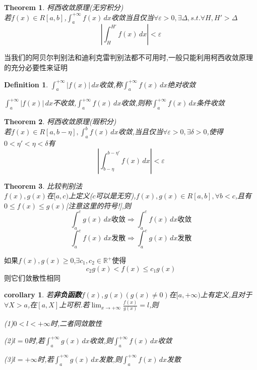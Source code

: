 \documentclass[11pt,hyperref,a4paper,UTF8]{ctexart}
\newtheorem{theorem}{Theorem}[subsection]
\newtheorem{corollary}{corollary}[subsection]
\newtheorem{definition}{Definition}[subsection]
\newcommand{\RR}{\mathbb{R}}
\newcommand{\abs}[1]{\left|#1\right|}
\begin{document}
\begin{CJK}{UTF8}{gkai}
\begin{theorem}
  柯西收敛原理(无穷积分)\\

  若$f(x) \in R[a,b]$,$\int_{a}^{+\infty} f(x)\, dx$收敛当且仅当$\forall \varepsilon > 0,\exists \Delta, s.t. \forall H,H' > \Delta$
  \[\abs{\int_{H}^{H'}f(x)\, dx} < \varepsilon\]
\end{theorem}
当我们的阿贝尔判别法和迪利克雷判别法都不可用时,一般只能利用柯西收敛原理的充分必要性来证明

\begin{definition}
  $\int_{a}^{+\infty}|f(x)|\, dx$收敛,称$\int_{a}^{+\infty}f(x)\, dx$绝对收敛

  $\int_{a}^{+\infty}|f(x)|\, dx$不收敛,$\int_{a}^{+\infty}f(x)\, dx$收敛,则称$\int_{a}^{+\infty}f(x)\, dx$条件收敛
\end{definition}

\begin{theorem}
  柯西收敛原理(瑕积分)\\
  
  若$f(x)\in R[a,b - \eta], \int_{a}^{b}f(x)\, dx$收敛,当且仅当$\forall \varepsilon > 0,\exists \delta > 0$,使得$0 < \eta' < \eta < \delta$有
  \[\abs{\int_{b - \eta}^{b - \eta'}f(x)\, dx}  < \varepsilon\]
\end{theorem}

\begin{theorem}
  比较判别法\\

  $f(x),g(x)$在$[a,c)$上定义($c$可以是无穷),$f(x),g(x)\in R[a,b],\forall b < c$,且有$0 \leq f(x) \leq g(x)$[注意这里的符号!],则
  \[\int_{a}^{c}g(x)\, dx\text{收敛} \Rightarrow \int_{a}^{c}f(x)\, dx\text{收敛}\]
  \[\int_{a}^{c}f(x)\, dx\text{发散} \Rightarrow \int_{a}^{c}g(x)\, dx\text{发散}\]
\end{theorem}

如果$f(x),g(x) \geq 0$,$\exists c_1,c_2 \in \RR^+$使得
\[c_2 g(x) < f(x) \leq c_1 g(x)\]
则它们敛散性相同

\begin{corollary}
  若\textbf{非负函数}$f(x),g(x)(g(x) \neq 0)$在$[a,+\infty)$上有定义,且对于$\forall X > a$,在$[a,X]$上可积.若$\lim_{x \to +\infty} \frac{f(x)}{g(x)} = l$,则

  (1)$0 < l < +\infty$时,二者同敛散性

  (2)$l = 0$时,若$\int_{a}^{+\infty}g(x)\, dx$收敛,则$\int_{a}^{+\infty}f(x)\, dx$收敛

  (3)$l = +\infty$时,若$\int_{a}^{+\infty}g(x)\, dx$发散,则$\int_{a}^{+\infty}f(x)\, dx$发散
\end{corollary}


\end{CJK}
\end{document}
